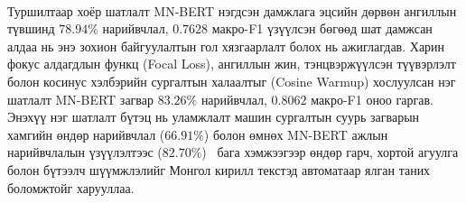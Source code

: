 \paragraph{}Туршилтаар хоёр шатлалт MN-BERT нэгдсэн дамжлага эцсийн дөрвөн ангиллын түвшинд $78.94\%$ нарийвчлал, $0.7628$ макро-F1 үзүүлсэн бөгөөд шат дамжсан алдаа нь энэ зохион байгуулалтын гол хязгаарлалт болох нь ажиглагдав. Харин фокус алдагдлын функц (Focal Loss), ангиллын жин, тэнцвэржүүлсэн түүвэрлэлт болон косинус хэлбэрийн сургалтын халаалтыг (Cosine Warmup) хослуулсан нэг шатлалт MN-BERT загвар $\mathbf{83.26\%}$ нарийвчлал, $\mathbf{0.8062}$ макро-F1 оноо гаргав. Энэхүү нэг шатлалт бүтэц нь уламжлалт машин сургалтын суурь загварын хамгийн өндөр нарийвчлал ($66.91\%$) болон өмнөх MN-BERT ажлын нарийвчлалын үзүүлэлтээс ($82.70\%$)~\cite{jargalmaa2025} бага хэмжээгээр өндөр гарч, хортой агуулга болон бүтээлч шүүмжлэлийг Монгол кирилл текстэд автоматаар ялган таних боломжтойг харууллаа.
